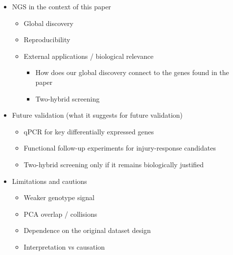 \documentclass[12pt]{article}
\begin{document}
\begin{itemize}
\begin{itemize}
\begin{itemize}
\item \textcolor{samcolor}{Helps link pathways}
\begin{itemize}
\item \textcolor{samcolor}{Proposed and new}
\end{itemize}
\end{itemize}
\item \textcolor{pitercolor}{Helps link the pathways already proposed in the paper with additional transcriptomic signals}
\item \textcolor{pitercolor}{Connects newly identified genes to the genes highlighted in the paper through broader transcriptomic patterns}
\item \textcolor{pitercolor}{Moves interpretation from single-gene emphasis toward pathway- and network-level context}
\end{itemize}
\item \textcolor{samcolor}{NGS in the context of this paper}
\begin{itemize}
\item \textcolor{samcolor}{Global discovery}
\item \textcolor{samcolor}{Reproducibility}
\item \textcolor{samcolor}{External applications / biological relevance}
\begin{itemize}
\item \textcolor{samcolor}{How does our global discovery connect to the genes found in the paper}
\item \textcolor{samcolor}{Two-hybrid screening}
\end{itemize}
\end{itemize}
\item \textcolor{pitercolor}{Future validation (what it suggests for future validation)}
\begin{itemize}
\item \textcolor{pitercolor}{qPCR for key differentially expressed genes}
\item \textcolor{pitercolor}{Functional follow-up experiments for injury-response candidates}
\item \textcolor{pitercolor}{Two-hybrid screening only if it remains biologically justified}
\end{itemize}
\item \textcolor{pitercolor}{Limitations and cautions}
\begin{itemize}
\item \textcolor{pitercolor}{Weaker genotype signal}
\item \textcolor{pitercolor}{PCA overlap / collisions}
\item \textcolor{pitercolor}{Dependence on the original dataset design}
\item \textcolor{pitercolor}{Interpretation vs causation}
\end{itemize}
\end{itemize}
\end{document}
